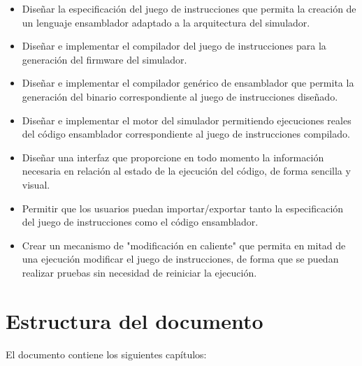 \begin{itemize}

\item Diseñar la especificación del juego de instrucciones que permita la creación de un lenguaje ensamblador adaptado a la arquitectura del simulador.

\item Diseñar e implementar el compilador del juego de instrucciones para la generación del firmware del simulador.

\item Diseñar e implementar el compilador genérico de ensamblador que permita la generación del binario correspondiente al juego de instrucciones diseñado.

\item Diseñar e implementar el motor del simulador permitiendo ejecuciones reales del código ensamblador correspondiente al juego de instrucciones compilado.

\item Diseñar una interfaz que proporcione en todo momento la información necesaria en relación al estado de la ejecución del código, de forma sencilla y visual.

\item Permitir que los usuarios puedan importar/exportar tanto la especificación del juego de instrucciones como el código ensamblador.

\item Crear un mecanismo de "modificación en caliente" que permita en mitad de una ejecución modificar el juego de instrucciones, de forma que se puedan realizar pruebas sin necesidad de reiniciar la ejecución.

\end{itemize}

\section{Estructura del documento}
\label{sec:document_structure}

El documento contiene los siguientes capítulos:

